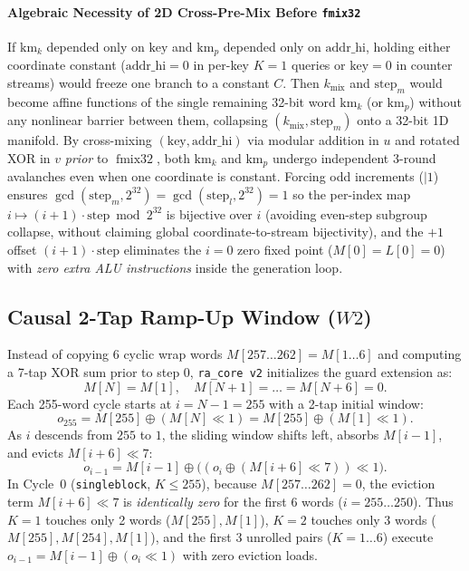 \documentclass[conference]{IEEEtran}
\DeclareMathOperator{\fmix}{fmix32}
\begin{document}
\paragraph{Algebraic Necessity of 2D Cross-Pre-Mix Before \texttt{fmix32}}
If $\text{km}_k$ depended only on $\text{key}$ and $\text{km}_p$ depended only on $\text{addr\_hi}$, holding either coordinate constant ($\text{addr\_hi}=0$ in per-key $K=1$ queries or $\text{key}=0$ in counter streams) would freeze one branch to a constant $C$. Then $k_{\text{mix}}$ and $\text{step}_m$ would become affine functions of the single remaining 32-bit word $\text{km}_k$ (or $\text{km}_p$) without any nonlinear barrier between them, collapsing $(k_{\text{mix}}, \text{step}_m)$ onto a 32-bit 1D manifold. By cross-mixing $(\text{key}, \text{addr\_hi})$ via modular addition in $u$ and rotated XOR in $v$ \emph{prior} to $\fmix$, both $\text{km}_k$ and $\text{km}_p$ undergo independent 3-round avalanches even when one coordinate is constant. Forcing odd increments ($\mid 1$) ensures $\gcd(\text{step}_m, 2^{32}) = \gcd(\text{step}_l, 2^{32}) = 1$ so the per-index map $i \mapsto (i+1)\cdot\text{step} \bmod 2^{32}$ is bijective over $i$ (avoiding even-step subgroup collapse, without claiming global coordinate-to-stream bijectivity), and the $+1$ offset $(i+1)\cdot\text{step}$ eliminates the $i=0$ zero fixed point ($M[0]=L[0]=0$) with \emph{zero extra ALU instructions} inside the generation loop.

\subsection{Causal 2-Tap Ramp-Up Window ($W2$)}\label{sec:w2}

Instead of copying 6 cyclic wrap words $M[257\ldots 262] = M[1\ldots 6]$ and computing a 7-tap XOR sum prior to step 0, \texttt{ra\_core v2} initializes the guard extension as:
\begin{equation}
M[N] = M[1], \quad M[N+1] = \dots = M[N+6] = 0.
\end{equation}
Each 255-word cycle starts at $i = N - 1 = 255$ with a 2-tap initial window:
\begin{equation}
o_{255} = M[255] \oplus (M[N] \ll 1) = M[255] \oplus (M[1] \ll 1).
\end{equation}
As $i$ descends from $255$ to $1$, the sliding window shifts left, absorbs $M[i-1]$, and evicts $M[i+6] \ll 7$:
\begin{equation}
o_{i-1} = M[i-1] \oplus \big((o_i \oplus (M[i+6] \ll 7)) \ll 1\big).
\end{equation}
In Cycle~0 (\texttt{singleblock}, $K \le 255$), because $M[257\ldots 262] = 0$, the eviction term $M[i+6] \ll 7$ is \emph{identically zero} for the first 6 words ($i = 255\ldots 250$). Thus $K=1$ touches only 2 words ($M[255], M[1]$), $K=2$ touches only 3 words ($M[255], M[254], M[1]$), and the first 3 unrolled pairs ($K=1\ldots 6$) execute $o_{i-1} = M[i-1] \oplus (o_i \ll 1)$ with zero eviction loads.
\end{document}

